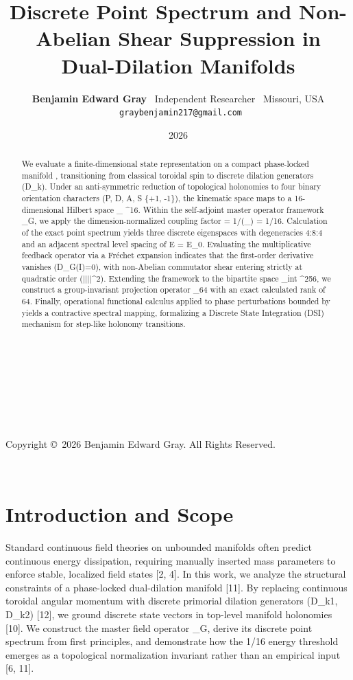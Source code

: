 \documentclass[12pt, a4paper]{article}
\title{\textbf{Discrete Point Spectrum and Non-Abelian Shear Suppression in Dual-Dilation Manifolds}}
\author{
\textbf{Benjamin Edward Gray} \
Independent Researcher \
Missouri, USA \
\texttt{graybenjamin217@gmail.com}
}
\date{2026}
\begin{document}
​\maketitle
​\begin{abstract}
\noindent We evaluate a finite-dimensional state representation on a compact phase-locked manifold , transitioning from classical toroidal spin to discrete dilation generators (D_{k}). Under an anti-symmetric reduction of topological holonomies to four binary orientation characters (P, D, A, S \in \{+1, -1\}), the kinematic space maps to a 16-dimensional Hilbert space _{} \cong {}^{16}. Within the self-adjoint master operator framework \hat{\Omega}_{G}, we apply the dimension-normalized coupling factor \kappa = 1/\dim(_{}) = 1/16. Calculation of the exact point spectrum yields three discrete eigenspaces with degeneracies 4:8:4 and an adjacent spectral level spacing of \Delta E = E_{0}. Evaluating the multiplicative feedback operator via a Fréchet expansion indicates that the first-order derivative vanishes (D\hat{\Omega}_{G}(I)=0), with non-Abelian commutator shear entering strictly at quadratic order (||||^{2}). Extending the framework to the bipartite space _{int} \cong {}^{256}, we construct a group-invariant projection operator \hat{\Pi}_{64} with an exact calculated rank of 64. Finally, operational functional calculus applied to phase perturbations bounded by \delta {} yields a contractive spectral mapping, formalizing a Discrete State Integration (DSI) mechanism for step-like holonomy transitions.
\end{abstract}
​\vspace{1em}
\begin{center}
\small Copyright \copyright~2026 Benjamin Edward Gray. All Rights Reserved.
\end{center}
​\newpage
\tableofcontents
\newpage
​\section{Introduction and Scope}
Standard continuous field theories on unbounded manifolds often predict continuous energy dissipation, requiring manually inserted mass parameters to enforce stable, localized field states [2, 4]. In this work, we analyze the structural constraints of a phase-locked dual-dilation manifold [11]. By replacing continuous toroidal angular momentum with discrete primorial dilation generators (D_{k1}, D_{k2}) [12], we ground discrete state vectors in top-level manifold holonomies [10]. We construct the master field operator \hat{\Omega}_{G}, derive its discrete point spectrum from first principles, and demonstrate how the 1/16 energy threshold emerges as a topological normalization invariant rather than an empirical input [6, 11].
\end{document}
